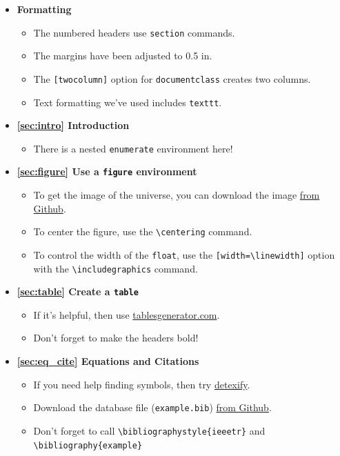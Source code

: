\documentclass[twocolumn]{article}
\begin{document}
\begin{itemize}
    \item \textbf{Formatting}
    \begin{itemize}
        \item The numbered headers use \texttt{section} commands.
        \item The margins have been adjusted to 0.5 in.
        \item The \texttt{[twocolumn]} option for \texttt{documentclass} creates two columns.
        \item Text formatting we've used includes \texttt{texttt}.
    \end{itemize}
    \item \textbf{\ref{sec:intro} Introduction}
    \begin{itemize}
        \item There is a nested \texttt{enumerate} environment here!
    \end{itemize}
    \item \textbf{\ref{sec:figure} Use a \texttt{figure} environment}
    \begin{itemize}
        \item To get the image of the universe, you can download the image \href{github.com/mdelrosa/latex101/blob/master/day02/exercise/images/universe.jpg}{from Github}.
        \item To center the figure, use the \texttt{\textbackslash centering} command.
        \item To control the width of the \texttt{float}, use the \texttt{[width=\textbackslash linewidth]} option with the \texttt{\textbackslash includegraphics} command.
    \end{itemize}
    \item \textbf{\ref{sec:table} Create a \texttt{table}}
    \begin{itemize}
        \item If it's helpful, then use \href{https://www.tablesgenerator.com/}{tablesgenerator.com}.
        \item Don't forget to make the headers bold!
    \end{itemize}
    \item \textbf{\ref{sec:eq_cite} Equations and Citations}
    \begin{itemize}
        \item If you need help finding symbols, then try \href{http://detexify.kirelabs.org/classify.html) }{detexify}.
        \item Download the database file (\texttt{example.bib}) \href{github.com/mdelrosa/latex101/blob/master/day02/exercise/example.bib}{from Github}.
        \item Don't forget to call \texttt{\textbackslash bibliographystyle\{ieeetr\}} and \texttt{\textbackslash bibliography\{example\}}
    \end{itemize}
\end{itemize}
\end{document}
